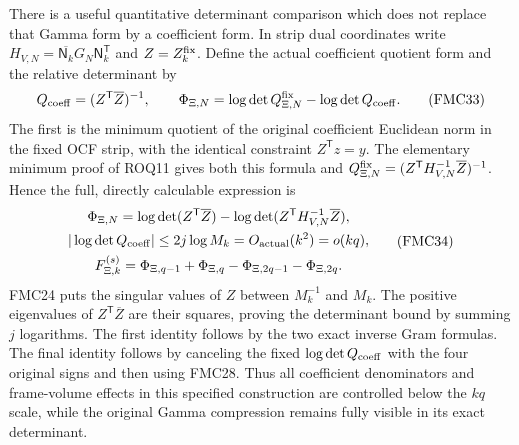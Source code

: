 \documentclass[11pt,a4paper]{article}
\begin{document}
There is a useful quantitative determinant comparison which does not
replace that Gamma form by a coefficient form. In strip dual coordinates
write $H_{V,N}=\overline{\mathsf N_k}G_N\mathsf N_k^{\mathsf T}$ and
$Z=Z_k^{\rm fix}$. Define the actual coefficient quotient form and
the relative determinant by
\[
 Q_{\rm coeff}=(Z^{\mathsf T}\overline Z)^{-1},\qquad
 \Phi_{\Xi,N}=\log\det Q_{\Xi,N}^{\rm fix}
                                  -\log\det Q_{\rm coeff}.
 \tag{FMC33}
\]
The first is the minimum quotient of the original coefficient
Euclidean norm in the fixed OCF strip, with the identical constraint
$Z^{\mathsf T}z=y$. The elementary minimum proof of ROQ11 gives
both this formula and
$Q_{\Xi,N}^{\rm fix}=(Z^{\mathsf T}H_{V,N}^{-1}\overline Z)^{-1}$.
Hence the full, directly calculable expression is
\[
 \begin{gathered}
 \Phi_{\Xi,N}=
       \log\det(Z^{\mathsf T}\overline Z)
       -\log\det(Z^{\mathsf T}H_{V,N}^{-1}\overline Z),\\
 |\log\det Q_{\rm coeff}|\le2j\log M_k
                       =O_{\rm actual}(k^2)=o(kq),\\
 F_{\Xi,k}^{(s)}
       =\Phi_{\Xi,q-1}+\Phi_{\Xi,q}
                              -\Phi_{\Xi,2q-1}-\Phi_{\Xi,2q}.
 \end{gathered}\tag{FMC34}
\]
FMC24 puts the singular values of $Z$ between $M_k^{-1}$ and
$M_k$. The positive eigenvalues of $Z^{\mathsf T}\overline Z$
are their squares, proving the determinant bound by summing $j$
logarithms. The first identity follows by the two exact inverse
Gram formulas. The final identity follows by canceling the fixed
$\log\det Q_{\rm coeff}$ with the four original signs and then
using FMC28. Thus all coefficient denominators and frame-volume
effects in this specified construction are controlled below the
$kq$ scale, while the original Gamma compression remains fully
visible in its exact determinant.
\end{document}

